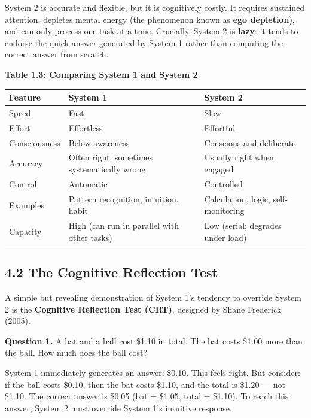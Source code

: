 \documentclass[12pt, letterpaper]{article}
\begin{document}
System 2 is accurate and flexible, but it is cognitively costly. It requires sustained attention, depletes mental energy (the phenomenon known as \textbf{ego depletion}), and can only process one task at a time. Crucially, System 2 is \textbf{lazy}: it tends to endorse the quick answer generated by System 1 rather than computing the correct answer from scratch.

\textbf{Table 1.3: Comparing System 1 and System 2}


\begin{table}[H]
\centering
\small
\begin{tabularx}{\linewidth}{lYY}
\toprule
Feature & System 1 & System 2 \\
\midrule
Speed & Fast & Slow \\
Effort & Effortless & Effortful \\
Consciousness & Below awareness & Conscious and deliberate \\
Accuracy & Often right; sometimes systematically wrong & Usually right when engaged \\
Control & Automatic & Controlled \\
Examples & Pattern recognition, intuition, habit & Calculation, logic, self-monitoring \\
Capacity & High (can run in parallel with other tasks) & Low (serial; degrades under load) \\
\bottomrule
\end{tabularx}
\end{table}


\medskip


\subsection{4.2 The Cognitive Reflection Test}


A simple but revealing demonstration of System 1's tendency to override System 2 is the \textbf{Cognitive Reflection Test (CRT)}, designed by Shane Frederick (2005).

\textbf{Question 1.} A bat and a ball cost \$1.10 in total. The bat costs \$1.00 more than the ball. How much does the ball cost?

System 1 immediately generates an answer: \$0.10. This feels right. But consider: if the ball costs \$0.10, then the bat costs \$1.10, and the total is \$1.20 --- not \$1.10. The correct answer is \$0.05 (bat = \$1.05, total = \$1.10). To reach this answer, System 2 must override System 1's intuitive response.
\end{document}

